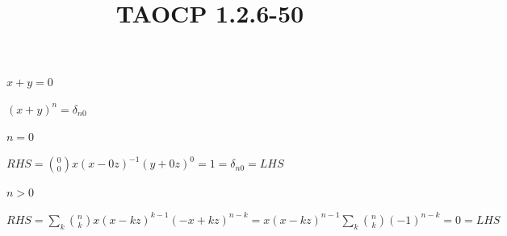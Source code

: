 \documentclass{article}
\title{TAOCP 1.2.6\mbox{-}50}
\begin{document}
\maketitle

\( x + y = 0 \)

\( {(x+y)}^{n} = \delta_{n0} \)

\( n = 0 \)

\( RHS = \binom{0}{0} x{(x-0z)}^{-1}{(y+0z)}^{0}=1 = \delta_{n0} = LHS \)

\( n > 0 \)

\( RHS = \sum_{k} \binom{n}{k}x{(x-kz)}^{k-1}{(-x+kz)}^{n-k} = x{(x-kz)}^{n-1} \sum_{k} \binom{n}{k} {(-1)}^{n-k} = 0 = LHS \)
\end{document}
